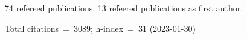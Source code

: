 74 refereed publications. 13 refeered publications as first author.

Total citations~=~3089; h-index~=~31 (2023-01-30)